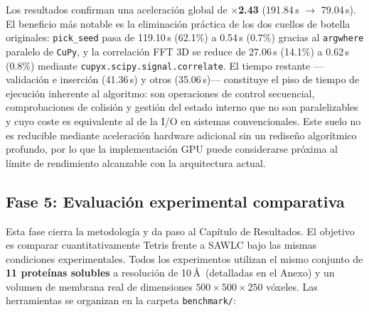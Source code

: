 \begin{enumerate}
     Los resultados confirman una aceleración global de $\times$\textbf{2.43} (191.84\,s $\to$ 79.04\,s). El beneficio más notable es la eliminación práctica de los dos cuellos de botella originales: \texttt{pick\_seed} pasa de 119.10\,s (62.1\%) a 0.54\,s (0.7\%) gracias al \texttt{argwhere} paralelo de \texttt{CuPy}, y la correlación FFT 3D se reduce de 27.06\,s (14.1\%) a 0.62\,s (0.8\%) mediante \texttt{cupyx.scipy.signal.correlate}. El tiempo restante —validación e inserción (41.36\,s) y otros (35.06\,s)— constituye el piso de tiempo de ejecución inherente al algoritmo: son operaciones de control secuencial, comprobaciones de colisión y gestión del estado interno que no son paralelizables y cuyo coste es equivalente al de la I/O en sistemas convencionales. Este suelo no es reducible mediante aceleración hardware adicional sin un rediseño algorítmico profundo, por lo que la implementación GPU puede considerarse próxima al límite de rendimiento alcanzable con la arquitectura actual.
    
    
\end{enumerate}

\subsection{Fase 5: Evaluación experimental comparativa}

Esta fase cierra la metodología y da paso al Capítulo de Resultados. El objetivo es comparar cuantitativamente Tetris frente a SAWLC bajo las mismas condiciones experimentales. Todos los experimentos utilizan el mismo conjunto de \textbf{11 proteínas solubles} a resolución de 10\,\AA\ (detalladas en el Anexo) y un volumen de membrana real de dimensiones $500\times500\times250$ vóxeles. Las herramientas se organizan en la carpeta \texttt{benchmark/}:

